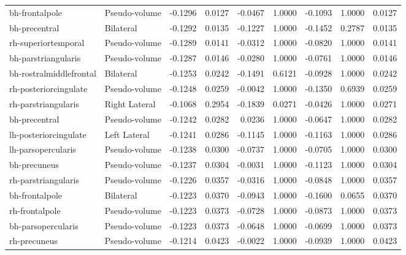 \documentclass{article}
\begin{document}
\begin{table}
\begin{tabular}{llrrrrrrr}
	bh-frontalpole & Pseudo-volume & -0.1296 & 0.0127 & -0.0467 & 1.0000 & -0.1093 & 1.0000 & 0.0127 \\
	bh-precentral & Bilateral & -0.1292 & 0.0135 & -0.1227 & 1.0000 & -0.1452 & 0.2787 & 0.0135 \\
	rh-superiortemporal & Pseudo-volume & -0.1289 & 0.0141 & -0.0312 & 1.0000 & -0.0820 & 1.0000 & 0.0141 \\
	bh-parstriangularis & Pseudo-volume & -0.1287 & 0.0146 & -0.0280 & 1.0000 & -0.0761 & 1.0000 & 0.0146 \\
	bh-rostralmiddlefrontal & Bilateral & -0.1253 & 0.0242 & -0.1491 & 0.6121 & -0.0928 & 1.0000 & 0.0242 \\
	rh-posteriorcingulate & Pseudo-volume & -0.1248 & 0.0259 & -0.0042 & 1.0000 & -0.1350 & 0.6939 & 0.0259 \\
	rh-parstriangularis & Right Lateral & -0.1068 & 0.2954 & -0.1839 & 0.0271 & -0.0426 & 1.0000 & 0.0271 \\
	bh-precentral & Pseudo-volume & -0.1242 & 0.0282 & 0.0236 & 1.0000 & -0.0647 & 1.0000 & 0.0282 \\
	lh-posteriorcingulate & Left Lateral & -0.1241 & 0.0286 & -0.1145 & 1.0000 & -0.1163 & 1.0000 & 0.0286 \\
	lh-parsopercularis & Pseudo-volume & -0.1238 & 0.0300 & -0.0737 & 1.0000 & -0.0705 & 1.0000 & 0.0300 \\
	bh-precuneus & Pseudo-volume & -0.1237 & 0.0304 & -0.0031 & 1.0000 & -0.1123 & 1.0000 & 0.0304 \\
	rh-parstriangularis & Pseudo-volume & -0.1226 & 0.0357 & -0.0316 & 1.0000 & -0.0848 & 1.0000 & 0.0357 \\
	bh-frontalpole & Bilateral & -0.1223 & 0.0370 & -0.0943 & 1.0000 & -0.1600 & 0.0655 & 0.0370 \\
	rh-frontalpole & Pseudo-volume & -0.1223 & 0.0373 & -0.0728 & 1.0000 & -0.0873 & 1.0000 & 0.0373 \\
	bh-parsopercularis & Pseudo-volume & -0.1223 & 0.0373 & -0.0648 & 1.0000 & -0.0699 & 1.0000 & 0.0373 \\
	rh-precuneus & Pseudo-volume & -0.1214 & 0.0423 & -0.0022 & 1.0000 & -0.0939 & 1.0000 & 0.0423 \\

\end{tabular}
\end{table}
\end{document}
